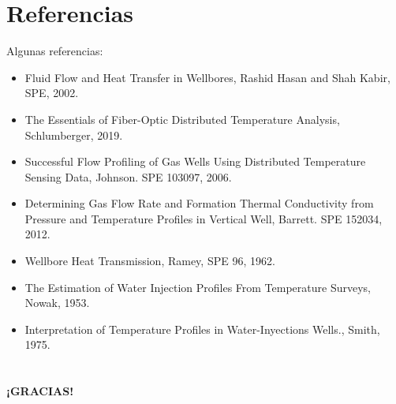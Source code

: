 \documentclass[presentation]{beamer}
\begin{document}
\section{Referencias}
\begin{frame}{Algunas referencias:}
	\begin{itemize}
		\item 
Fluid Flow and Heat Transfer in Wellbores, Rashid Hasan and Shah Kabir, SPE, 2002.
		\item The Essentials of Fiber-Optic Distributed Temperature Analysis, Schlumberger, 2019.
		\item Successful Flow Profiling of Gas Wells Using Distributed Temperature Sensing Data, Johnson. SPE 103097, 2006.
		\item Determining Gas Flow Rate and Formation Thermal Conductivity from Pressure and Temperature Profiles in Vertical Well, Barrett. SPE 152034, 2012.
		\item Wellbore Heat Transmission, Ramey, SPE 96, 1962.
		\item  The Estimation of Water Injection Profiles From Temperature Surveys, Nowak, 1953.
		\item Interpretation of Temperature Profiles in Water-Inyections Wells., Smith, 1975.
		
	\end{itemize}
	
\end{frame}
	
	
	
	
\section{}
\begin{frame}
	\textbf{\centering\LARGE{¡GRACIAS!}}
\end{frame}
\end{document}

